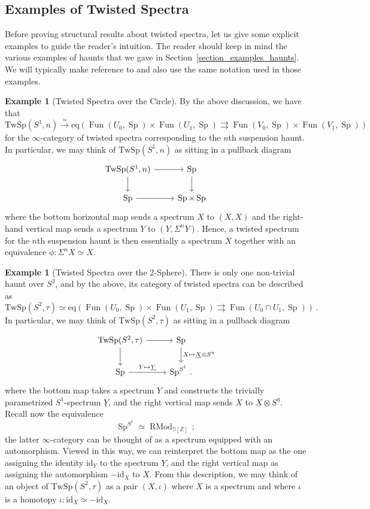 \documentclass[10pt]{amsart}
\theoremstyle{plain}
\theoremstyle{definition}
\newtheorem{example}[theorem]{Example}
\DeclareMathOperator{\Sp}{Sp}
\DeclareMathOperator{\Fun}{Fun}
\def\on{\operatorname}
\newcommand{\id}{\mathrm{id}}
\newcommand{\bS}{\mathbb{S}}
\newcommand{\bZ}{\mathbb{Z}}
\newcommand{\TwSp}{\mathrm{TwSp}}
\begin{document}
\subsection{Examples of Twisted Spectra}

Before proving structural results about twisted spectra, let us give some explicit examples to guide the reader's intuition.
The reader should keep in mind the various examples of haunts that we gave in Section~\ref{section_examples_haunts}.
We will typically make reference to and also use the same notation used in those examples.

\begin{example}[Twisted Spectra over the Circle]
  By the above discussion, we have that
  \[
  \TwSp(S^1, n) \overset{\simeq}\to \mathrm{eq} \left(\Fun(U_0 , \Sp) \times \Fun(U_1,\Sp) \rightrightarrows \Fun(V_0,\Sp) \times \Fun(V_1,\Sp) \right)
  \]
  for the $\infty$-category of twisted spectra corresponding to the $n$th suspension haunt.
  In particular, we may think of $\TwSp(S^1, n)$ as sitting in a pullback diagram
  \[
  \begin{tikzcd}
    \TwSp(S^1,n) \arrow[r] \arrow[d] & \Sp \arrow[d] \\
    \Sp \arrow[r] & \Sp \times \Sp
  \end{tikzcd}
  \]
  where the bottom horizontal map sends a spectrum $X$ to $(X,X)$ and the right-hand vertical map sends a spectrum $Y$ to $(Y,\Sigma^n Y)$.
  Hence, a twisted spectrum for the $n$th suspension haunt is then essentially a spectrum $X$ together with an equivalence $\phi : \Sigma^n X \simeq X$.
\end{example}

\begin{example}[Twisted Spectra over the 2-Sphere]
  There is only one non-trivial haunt over $S^2$, and by the above, its category of twisted spectra can be described as
  \[
  \TwSp(S^2,\tau) \simeq \mathrm{eq} \left(\Fun(U_0 , \Sp) \times \Fun(U_1,\Sp) \rightrightarrows \Fun(U_0 \cap U_1 ,\Sp) \right) \,.
  \]
  In particular, we may think of $\TwSp(S^2, \tau)$ as sitting in a pullback diagram
\[
\begin{tikzcd}
\TwSp(S^2, \tau) \arrow[r] \arrow[d] & \Sp \arrow[d,"X \mapsto \underline{X} \otimes S^{\eta}"] \\
\Sp \arrow[r, "Y \mapsto \underline{Y}"] & \Sp^{S^1} \,.
\end{tikzcd}
\]
where the bottom map takes a spectrum $Y$ and constructs the trivially parametrized $S^1$-spectrum $\underline{Y}$, and the right vertical map sends $X$ to $\underline{X} \otimes S^\eta$.
Recall now the equivalence
\[
\Sp^{S^1} \simeq \on{RMod}_{\bS[\bZ]} \,;
\]
the latter $\infty$-category can be thought of as a spectrum equipped with an automorphism.
Viewed in this way, we can reinterpret the bottom map as the one assigning the identity $\id_{Y}$ to the spectrum $Y$, and the right vertical map as assigning the automorphism $-\id_{X}$ to $X$.
From this description, we may think of an object of $\TwSp(S^2, \tau)$ as a pair $(X,\iota)$ where $X$ is a spectrum and where $\iota$ is a homotopy $\iota: \id_{X} \simeq -\id_{X}$.
\end{example}
\end{document}

